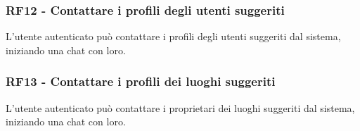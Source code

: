 \documentclass[12pt, a4paper]{article}
\begin{document}
\subsubsection{RF12 - Contattare i profili degli utenti suggeriti}

L'utente autenticato può contattare i profili degli utenti suggeriti dal sistema, iniziando una chat con loro.

\subsubsection{RF13 - Contattare i profili dei luoghi suggeriti}

L'utente autenticato può contattare i proprietari dei luoghi suggeriti dal sistema, iniziando una chat con loro.
\end{document}
